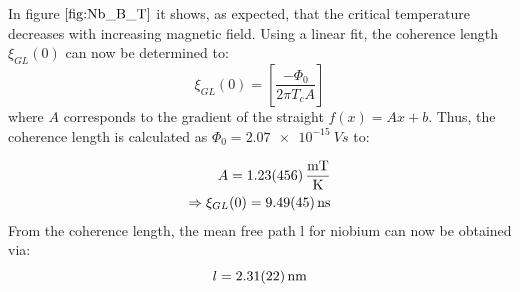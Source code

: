 In figure $\autoref{fig:Nb_B_T}$ it shows, as expected, that the critical temperature decreases with increasing magnetic field. Using a linear fit, the coherence length $\xi_{GL}(0)$ can now be determined to:
\begin{equation}
    \xi_{GL}(0)= \left[ \frac{-\Phi_0}{2\pi T_cA} \right]
\end{equation}
where $A$ corresponds to the gradient of the straight $f(x) = Ax+b$.  Thus, the coherence length is calculated as $\Phi_0 = \SI{2.07e-15}{Vs} $ to:

\begin{align*}
    A = \SI{1,23\pm 4,56}{\frac{mT}{K}} \\
    \Rightarrow \xi_{GL}(0)= \SI{9,49\pm0,45}{ns} \\
\end{align*}
From the coherence length, the mean free path l for niobium can now be obtained via:
\begin{equation}
    l = \SI{2,31\pm0,22}{nm}
\end{equation}